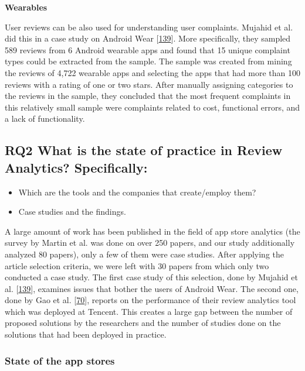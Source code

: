 \documentclass[]{book}
\providecommand{\tightlist}{%
  \setlength{\itemsep}{0pt}\setlength{\parskip}{0pt}}
\begin{document}
\textbf{Wearables}

User reviews can be also used for understanding user complaints. Mujahid
et al. did this in a case study on Android Wear
{[}\protect\hyperlink{ref-mujahid2017examining}{139}{]}. More
specifically, they sampled 589 reviews from 6 Android wearable apps and
found that 15 unique complaint types could be extracted from the sample.
The sample was created from mining the reviews of 4,722 wearable apps
and selecting the apps that had more than 100 reviews with a rating of
one or two stars. After manually assigning categories to the reviews in
the sample, they concluded that the most frequent complaints in this
relatively small sample were complaints related to cost, functional
errors, and a lack of functionality.

\subsection{\texorpdfstring{\textbf{RQ2} What is the state of practice
in Review Analytics?
Specifically:}{RQ2 What is the state of practice in Review Analytics? Specifically:}}\label{rq2-what-is-the-state-of-practice-in-review-analytics-specifically}

\begin{itemize}
\tightlist
\item
  Which are the tools and the companies that create/employ them?
\item
  Case studies and the findings.
\end{itemize}

A large amount of work has been published in the field of app store
analytics (the survey by Martin et al. was done on over 250 papers, and
our study additionally analyzed 80 papers), only a few of them were case
studies. After applying the article selection criteria, we were left
with 30 papers from which only two conducted a case study. The first
case study of this selection, done by Mujahid et al.
{[}\protect\hyperlink{ref-mujahid2017examining}{139}{]}, examines issues
that bother the users of Android Wear. The second one, done by Gao et
al. {[}\protect\hyperlink{ref-gao2018online}{70}{]}, reports on the
performance of their review analytics tool which was deployed at
Tencent. This creates a large gap between the number of proposed
solutions by the researchers and the number of studies done on the
solutions that had been deployed in practice.

\subsubsection{State of the app stores}\label{state-of-the-app-stores}
\end{document}
